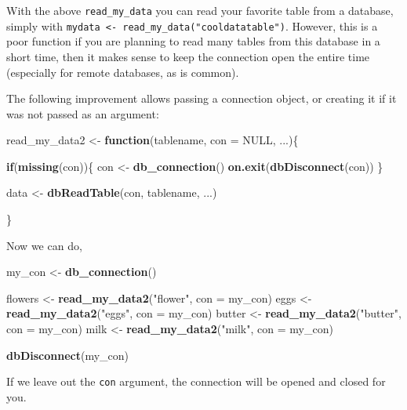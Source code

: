 \documentclass[]{book}
\newenvironment{Shaded}{\begin{snugshade}}{\end{snugshade}}
\newcommand{\ControlFlowTok}[1]{\textcolor[rgb]{0.13,0.29,0.53}{\textbf{#1}}}
\newcommand{\DataTypeTok}[1]{\textcolor[rgb]{0.13,0.29,0.53}{#1}}
\newcommand{\KeywordTok}[1]{\textcolor[rgb]{0.13,0.29,0.53}{\textbf{#1}}}
\newcommand{\NormalTok}[1]{#1}
\newcommand{\OtherTok}[1]{\textcolor[rgb]{0.56,0.35,0.01}{#1}}
\newcommand{\StringTok}[1]{\textcolor[rgb]{0.31,0.60,0.02}{#1}}
\begin{document}
With the above \texttt{read\_my\_data} you can read your favorite table from a database, simply with \texttt{mydata\ \textless{}-\ read\_my\_data("cooldatatable")}. However, this is a poor function if you are planning to read many tables from this database in a short time, then it makes sense to keep the connection open the entire time (especially for remote databases, as is common).

The following improvement allows passing a connection object, or creating it if it was not passed as an argument:

\begin{Shaded}
\begin{Highlighting}[]
\NormalTok{read_my_data2 <-}\StringTok{ }\ControlFlowTok{function}\NormalTok{(tablename, }\DataTypeTok{con =} \OtherTok{NULL}\NormalTok{, ...)\{}
  
  \ControlFlowTok{if}\NormalTok{(}\KeywordTok{missing}\NormalTok{(con))\{}
\NormalTok{    con <-}\StringTok{ }\KeywordTok{db_connection}\NormalTok{()}
    \KeywordTok{on.exit}\NormalTok{(}\KeywordTok{dbDisconnect}\NormalTok{(con))}
\NormalTok{  \}}
  
\NormalTok{  data <-}\StringTok{ }\KeywordTok{dbReadTable}\NormalTok{(con, tablename, ...)}
  
\NormalTok{\}}
\end{Highlighting}
\end{Shaded}

Now we can do,

\begin{Shaded}
\begin{Highlighting}[]
\NormalTok{my_con <-}\StringTok{ }\KeywordTok{db_connection}\NormalTok{()}

\NormalTok{flowers <-}\StringTok{ }\KeywordTok{read_my_data2}\NormalTok{(}\StringTok{"flower"}\NormalTok{, }\DataTypeTok{con =}\NormalTok{ my_con)}
\NormalTok{eggs <-}\StringTok{ }\KeywordTok{read_my_data2}\NormalTok{(}\StringTok{"eggs"}\NormalTok{, }\DataTypeTok{con =}\NormalTok{ my_con)}
\NormalTok{butter <-}\StringTok{ }\KeywordTok{read_my_data2}\NormalTok{(}\StringTok{"butter"}\NormalTok{, }\DataTypeTok{con =}\NormalTok{ my_con)}
\NormalTok{milk <-}\StringTok{ }\KeywordTok{read_my_data2}\NormalTok{(}\StringTok{"milk"}\NormalTok{, }\DataTypeTok{con =}\NormalTok{ my_con)}

\KeywordTok{dbDisconnect}\NormalTok{(my_con)}
\end{Highlighting}
\end{Shaded}

If we leave out the \texttt{con} argument, the connection will be opened and closed for you.
\end{document}
